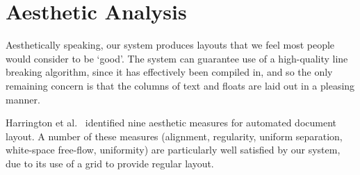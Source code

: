 \chapter{Aesthetic Analysis}\label{ch:aesthetics}


Aesthetically speaking, our system produces layouts that we feel most people would consider to be `good'. The system can guarantee use of a high-quality line breaking algorithm, since it has effectively been compiled in, and so the only remaining concern is that the columns of text and floats are laid out in a pleasing manner.

Harrington et al.~\cite{Harrington2004} identified nine aesthetic measures for automated document layout. A number of these measures (alignment, regularity, uniform separation, white-space free-flow, uniformity) are particularly well satisfied by our system, due to its use of a grid to provide regular layout.

    